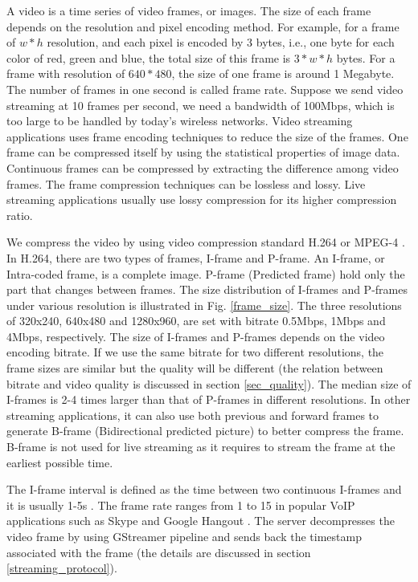 A video is a time series of video frames, or images. 
The size of each frame depends on the resolution and pixel encoding method. 
For example, for a frame of $w * h$ resolution, and each pixel 
is encoded by 3 bytes, i.e., 
one byte for each color of red, green and blue,
the total size of this frame is $3 * w * h$ bytes. 
For a frame with resolution of $640*480$, 
the size of one frame is around 1 Megabyte. 
The number of frames in one second is called frame rate. 
Suppose we send video streaming at 10 frames per second, 
we need a bandwidth of 100Mbps, which is too large to
be handled by today's wireless networks. 
Video streaming applications uses frame encoding techniques
to reduce the size of the frames. 
One frame can be compressed itself by using the statistical 
properties of image data. 
Continuous frames can be compressed by extracting the 
difference among video frames. 
The frame compression techniques can be lossless and lossy. 
Live streaming applications usually use lossy compression 
for its higher compression ratio. 


We compress the video by using video compression standard 
H.264 or MPEG-4 \cite{marpe2006h}.
In H.264, there are two types of frames, 
I-frame and P-frame. 
An I-frame, or Intra-coded frame, is a complete image. 
P-frame (Predicted frame)  
hold only the part that changes between frames.
The size distribution of I-frames and P-frames
under various resolution is illustrated in Fig. \ref{frame_size}. 
The three resolutions of 320x240, 640x480 and 1280x960, 
are set with bitrate 0.5Mbps, 1Mbps and 4Mbps, respectively. 
The size of I-frames and P-frames depends on 
the video encoding bitrate. 
If we use the same bitrate for two different resolutions, 
the frame sizes are similar but the quality will
be different (the relation between bitrate and video quality is
discussed in section \ref{sec_quality}). 
The median size of I-frames is 2-4 times larger
than that of P-frames in different resolutions. 
In other streaming applications, 
it can also use both previous and forward frames 
to generate B-frame (Bidirectional predicted picture) 
to better compress the frame.
B-frame is not used for live streaming as it requires
to stream the frame at the earliest possible time. 



The I-frame interval is defined as the time between 
two continuous I-frames and it is usually 1-5s \cite{zhang2012profiling, yu2014can}. 
The frame rate ranges from 1 to 15 in popular VoIP 
applications such as Skype \cite{zhang2012profiling} and Google Hangout \cite{yu2014can}. 
The server decompresses the video frame by using GStreamer pipeline \cite{gstreamer} 
and sends back the timestamp associated with the frame 
(the details are discussed in section \ref{streaming_protocol}). 


